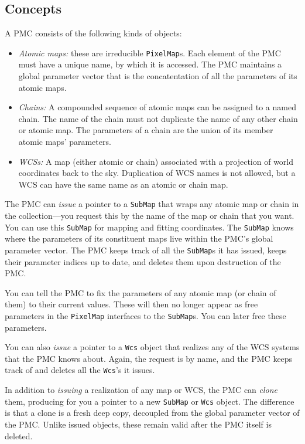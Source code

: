 \documentclass[11pt,preprint,flushrt]{aastex}
\begin{document}
\subsection{Concepts}
A PMC consists of the following kinds of objects:
\begin{itemize}
\item {\it Atomic maps:} these are irreducible {\tt PixelMap}s.  Each element of the PMC must have a unique name, by which it is accessed.  The PMC maintains a global parameter vector that is the concatentation of all the parameters of its atomic maps.
\item {\it Chains:} A compounded sequence of atomic maps can be assigned to a named chain.  The name of the chain must not duplicate the name of any other chain or atomic map.  The parameters of a chain are the union of its member atomic maps' parameters.
\item {\it WCSs:} A map (either atomic or chain) associated with a projection of world coordinates back to the sky.  Duplication of WCS names is not allowed, but a WCS can have the same name as an atomic or chain map.
\end{itemize}

The PMC can {\em issue} a pointer to a {\tt SubMap} that wraps any atomic map or chain in the collection---you request this by the name of the map or chain that you want.  You can use this {\tt SubMap} for mapping and fitting coordinates.  The {\tt SubMap} knows where the parameters of its constituent maps live within the PMC's global parameter vector.  The PMC keeps track of all the {\tt SubMap}s it has issued, keeps their parameter indices up to date, and deletes them upon destruction of the PMC.

You can tell the PMC to fix the parameters of any atomic map (or chain of them) to their current values.  These will then no longer appear as free parameters in the {\tt PixelMap} interfaces to the {\tt SubMap}s.  You can later free these parameters.

You can also {\em issue} a pointer to a {\tt Wcs} object that realizes any of the WCS systems that the PMC knows about.  Again, the request is by name, and the PMC keeps track of and deletes all the {\tt Wcs}'s it issues.

In addition to {\em issuing} a realization of any map or WCS, the PMC can {\em clone} them, producing for you a pointer to a new {\tt SubMap} or {\tt Wcs} object.  The difference is that a clone is a fresh deep copy, decoupled from the global parameter vector of the PMC.  Unlike issued objects, these remain valid after the PMC itself is deleted.
\end{document}
